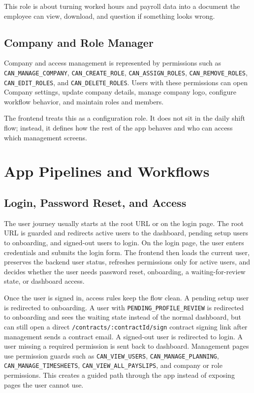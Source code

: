 \documentclass[11pt]{article}
\newcommand{\code}[1]{\nolinkurl{#1}}
\begin{document}
This role is about turning worked hours and payroll data into a document the employee can view, download, and question if something looks wrong.

\subsection{Company and Role Manager}

Company and access management is represented by permissions such as \code{CAN_MANAGE_COMPANY}, \code{CAN_CREATE_ROLE}, \code{CAN_ASSIGN_ROLES}, \code{CAN_REMOVE_ROLES}, \code{CAN_EDIT_ROLES}, and \code{CAN_DELETE_ROLES}. Users with these permissions can open Company settings, update company details, manage company logo, configure workflow behavior, and maintain roles and members.

The frontend treats this as a configuration role. It does not sit in the daily shift flow; instead, it defines how the rest of the app behaves and who can access which management screens.
\section{App Pipelines and Workflows}

\subsection{Login, Password Reset, and Access}

The user journey usually starts at the root URL or on the login page. The root URL is guarded and redirects active users to the dashboard, pending setup users to onboarding, and signed-out users to login. On the login page, the user enters credentials and submits the login form. The frontend then loads the current user, preserves the backend user status, refreshes permissions only for active users, and decides whether the user needs password reset, onboarding, a waiting-for-review state, or dashboard access.

Once the user is signed in, access rules keep the flow clean. A pending setup user is redirected to onboarding. A user with \code{PENDING_PROFILE_REVIEW} is redirected to onboarding and sees the waiting state instead of the normal dashboard, but can still open a direct \code{/contracts/:contractId/sign} contract signing link after management sends a contract email. A signed-out user is redirected to login. A user missing a required permission is sent back to dashboard. Management pages use permission guards such as \code{CAN_VIEW_USERS}, \code{CAN_MANAGE_PLANNING}, \code{CAN_MANAGE_TIMESHEETS}, \code{CAN_VIEW_ALL_PAYSLIPS}, and company or role permissions. This creates a guided path through the app instead of exposing pages the user cannot use.
\end{document}
